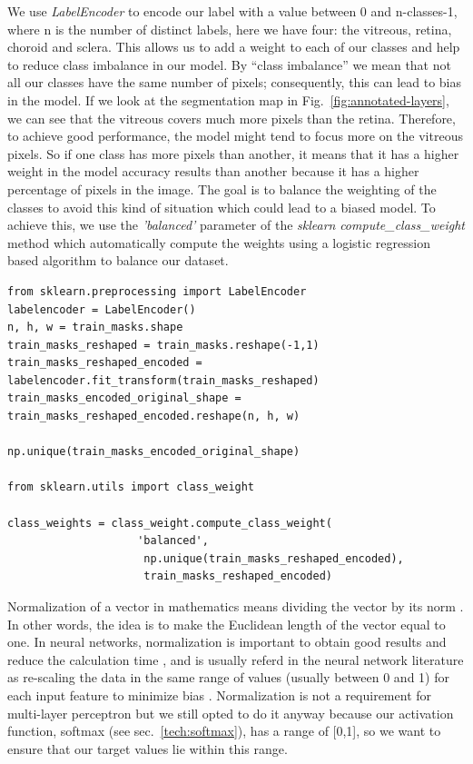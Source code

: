 \documentclass[12pt,a4paper]{scrartcl}
\begin{document}
We use \emph{LabelEncoder} \cite{scikit-learn} to encode our label with a value between 0 and n-classes-1, where n is the number of distinct labels, here we have four: the vitreous, retina, choroid and sclera. This allows us to add a weight to each of our classes and help to reduce class imbalance in our model. By ``class imbalance'' we mean that not all our classes have the same number of pixels; consequently, this can lead to bias in the model. If we look at the segmentation map in Fig.~\ref{fig:annotated-layers}, we can see that the vitreous covers much more pixels than the retina. Therefore, to achieve good performance, the model might tend to focus more on the vitreous pixels. So if one class has more pixels than another, it means that it has a higher weight in the model accuracy results than another because it has a higher percentage of pixels in the image. The goal is to balance the weighting of the classes to avoid this kind of situation which could lead to a biased model. To achieve this, we use the \emph{'balanced'} parameter of the \emph{sklearn} \cite{scikit-learn} \emph{compute\_class\_weight} method which automatically compute the weights using a logistic regression based algorithm \cite{scikit-learn} to balance our dataset. 

\begin{lstlisting}[caption={Encoding of the labels and weights attributions to the class, code from \emph{train.py} file}]
from sklearn.preprocessing import LabelEncoder
labelencoder = LabelEncoder()
n, h, w = train_masks.shape
train_masks_reshaped = train_masks.reshape(-1,1)
train_masks_reshaped_encoded = labelencoder.fit_transform(train_masks_reshaped)
train_masks_encoded_original_shape = train_masks_reshaped_encoded.reshape(n, h, w)

np.unique(train_masks_encoded_original_shape)

from sklearn.utils import class_weight

class_weights = class_weight.compute_class_weight(
                    'balanced',
                     np.unique(train_masks_reshaped_encoded),
                     train_masks_reshaped_encoded)
\end{lstlisting}

Normalization of a vector in mathematics means dividing the vector by its norm \cite{Normalization_Vector_Machines:2001}. In other words, the idea is to make the Euclidean length of the vector equal to one. In neural networks, normalization is important to obtain good results and reduce the calculation time \cite{Normalizazion_NN}, and is usually referd in the neural network literature as re-scaling the data in the same range of values (usually between 0 and 1) for each input feature to minimize bias \cite{Normalizazion_NN_classification}. Normalization is not a requirement for multi-layer perceptron but we still opted to do it anyway because our activation function, softmax (see sec.~\ref{tech:softmax}), has a range of [0,1], so we want to ensure that our target values lie within this range.
\end{document}
